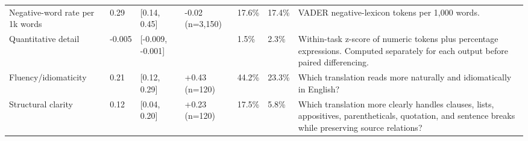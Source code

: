 \begin{longtable}{lllllll}
Negative-word rate per 1k words & 0.29 & [0.14, 0.45] & -0.02 (n=3,150) & 17.6\% & 17.4\% & VADER negative-lexicon tokens per 1,000 words. \\
Quantitative detail & -0.005 & [-0.009, -0.001] &  & 1.5\% & 2.3\% & Within-task z-score of numeric tokens plus percentage expressions. Computed separately for each output before paired differencing. \\
Fluency/idiomaticity & 0.21 & [0.12, 0.29] & +0.43 (n=120) & 44.2\% & 23.3\% & Which translation reads more naturally and idiomatically in English? \\
Structural clarity & 0.12 & [0.04, 0.20] & +0.23 (n=120) & 17.5\% & 5.8\% & Which translation more clearly handles clauses, lists, appositives, parentheticals, quotation, and sentence breaks while preserving source relations? \\
\end{longtable}
